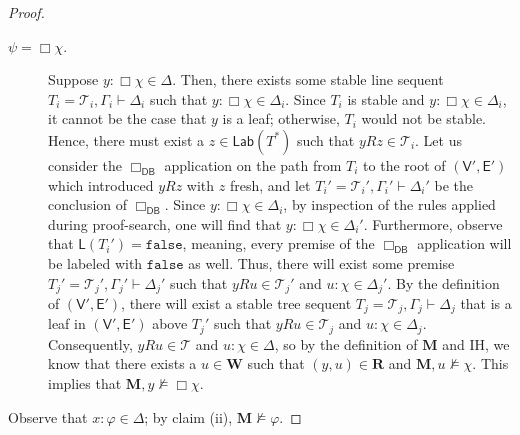 \documentclass[copyright,creativecommons]{eptcs}
\newtheorem{theorem}{Theorem}[section]
\newcommand{\tel}{\mathcal{T}}
\renewcommand{\phi}{\varphi}
\newcommand{\calc}{\mathsf{CSGL}}
\newcommand{\lab}{\mathsf{Lab}}
\newcommand{\sar}{\vdash}
\newcommand{\tseq}{T} %
\newcommand{\true}{\mathtt{true}}
\newcommand{\false}{\mathtt{false}}
\newcommand{\prove}{\mathtt{prove}}
\newcommand{\ndrule}{\Box_\mathsf{DB}}
\newcommand{\ctv}{\mathsf{V}}
\newcommand{\cte}{\mathsf{E}}
\newcommand{\ctl}{\mathsf{L}}
\newcommand{\fval}{\false} %
\newcommand{\M}{\mathbf{M}}
\newcommand{\W}{\mathbf{W}}
\newcommand{\R}{\mathbf{R}}
\begin{document}
\begin{proof}
\begin{description}
\item[$\psi = \Box \chi.$] Suppose $y : \Box \chi \in \Delta$. Then, there exists some stable line sequent $\tseq_{i} = \tel_{i}, \Gamma_{i} \sar \Delta_{i}$ such that $y : \Box \chi \in \Delta_{i}$. Since $\tseq_{i}$ is stable and $y : \Box \chi \in \Delta_{i}$, it cannot be the case that $y$ is a leaf; otherwise, $\tseq_{i}$ would not be stable. Hence, there must exist a $z \in \lab(\tseq^{*})$ such that $yRz \in \tel_{i}$. Let us consider the $\ndrule$ application on the path from $\tseq_{i}$ to the root of $(\ctv',\cte')$ which introduced $yRz$ with $z$ fresh, and let $\tseq_{i}' = \tel_{i}', \Gamma_{i}' \sar \Delta_{i}'$ be the conclusion of $\ndrule$. Since $y : \Box \chi \in \Delta_{i}$, by inspection of the rules applied during proof-search, one will find that $y : \Box \chi \in \Delta_{i}'$. Furthermore, observe that $\ctl(\tseq_{i}') = \fval$, meaning, every premise of the $\ndrule$ application will be labeled with $\fval$ as well. Thus, there will exist some premise $\tseq_{j}' = \tel_{j}', \Gamma_{j}' \sar \Delta_{j}'$ such that $yRu \in \tel_{j}'$ and $u : \chi \in \Delta_{j}'$. By the definition of $(\ctv',\cte')$, there will exist a stable tree sequent $\tseq_{j} = \tel_{j}, \Gamma_{j} \sar \Delta_{j}$ that is a leaf in $(\ctv',\cte')$ above $\tseq_{j}'$ such that $yRu \in \tel_{j}$ and $u : \chi \in \Delta_{j}$. Consequently, $yRu \in \tel$ and $u : \chi \in \Delta$, so by the definition of $\M$ and IH, we know that there exists a $u \in \W$ such that $(y,u) \in \R$ and $\M, u \not\models \chi$. This implies that $\M, y \not\models \Box \chi$.

\end{description}
Observe that $x : \phi \in \Delta$; by claim (ii), $\M \not\models \phi$.
\end{proof}

\end{document}
